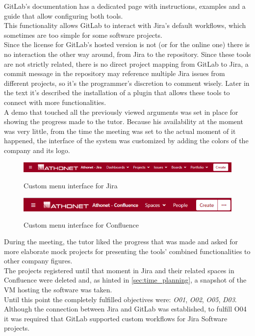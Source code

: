 	GitLab's documentation has a dedicated page with instructions, examples and a guide that allow configuring both tools\cite{integrations}.\\
	This functionality allows GitLab to interact with Jira's default workflows, which sometimes are too simple for some software projects.\\
	Since the license for GitLab's hosted version is not  (or  for the online one) there is no interaction the other way around, from Jira to the repository\cite{jira_development_panel}.
	Since these tools are not strictly related, there is no direct project mapping from GitLab to Jira, a commit message in the repository may reference multiple Jira issues from different projects, so it's the programmer's discretion to comment wisely.
	Later in the text it's described the installation of a plugin that allows these tools to connect with more functionalities.\\
	A demo that touched all the previously viewed arguments was set in place for showing the progress made to the tutor.	
	Because his availability at the moment was very little, from the time the meeting was set to the actual moment of it happened, the interface of the system was customized by adding the colors of the company and its logo.
	\begin{figure}[H]
		\centering
		\includegraphics[width=\textwidth]{resources/jira_custom}\\
		\caption{Custom menu interface for Jira}
	\end{figure}
	\vspace{-.5cm}
	\begin{figure}[H]
		\centering
		\includegraphics[width=.85\textwidth]{resources/confluence_custom}\\
		\caption{Custom menu interface for Confluence}
	\end{figure}
	During the meeting, the tutor liked the progress that was made and asked for more elaborate mock projects for presenting the tools' combined functionalities to other company figures.\\
	The projects registered until that moment in Jira and their related spaces in Confluence were deleted and, as hinted in \ref{sec:time_planning}, a snapshot of the VM hosting the software was taken.\\
	Until this point the completely fulfilled objectives were: \textit{O01}, \textit{O02}, \textit{O05}, \textit{D03}.\\
	Although the connection between Jira and GitLab was established, to fulfill O04 it was required that GitLab supported custom workflows for Jira Software projects.
	
